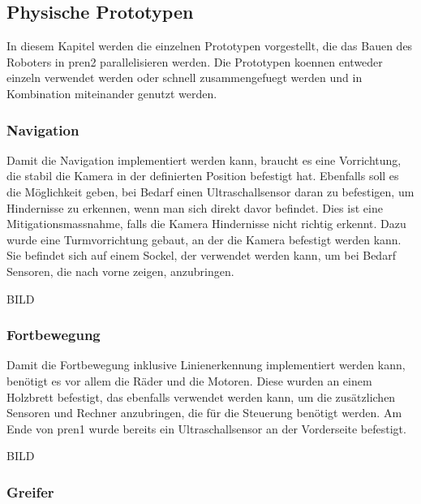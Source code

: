 
\subsection{Physische Prototypen}\label{prototyp-products}

In diesem Kapitel werden die einzelnen Prototypen vorgestellt, die das Bauen des Roboters in \acrshort{pren2} parallelisieren werden. Die Prototypen koennen entweder einzeln verwendet werden oder schnell zusammengefuegt werden und in Kombination miteinander genutzt werden.

\subsubsection{Navigation}

Damit die Navigation implementiert werden kann, braucht es eine Vorrichtung, die stabil die Kamera in der definierten Position befestigt hat. Ebenfalls soll es die Möglichkeit geben, bei Bedarf einen Ultraschallsensor daran zu befestigen, um Hindernisse zu erkennen, wenn man sich direkt davor befindet. Dies ist eine Mitigationsmassnahme, falls die Kamera Hindernisse nicht richtig erkennt. Dazu wurde eine Turmvorrichtung gebaut, an der die Kamera befestigt werden kann. Sie befindet sich auf einem Sockel, der verwendet werden kann, um bei Bedarf Sensoren, die nach vorne zeigen, anzubringen.

BILD

\subsubsection{Fortbewegung}

Damit die Fortbewegung inklusive Linienerkennung implementiert werden kann, benötigt es vor allem die Räder und die Motoren. Diese wurden an einem Holzbrett befestigt, das ebenfalls verwendet werden kann, um die zusätzlichen Sensoren und Rechner anzubringen, die für die Steuerung benötigt werden. Am Ende von \acrshort{pren1} wurde bereits ein Ultraschallsensor an der Vorderseite befestigt.

BILD

\subsubsection{Greifer}

